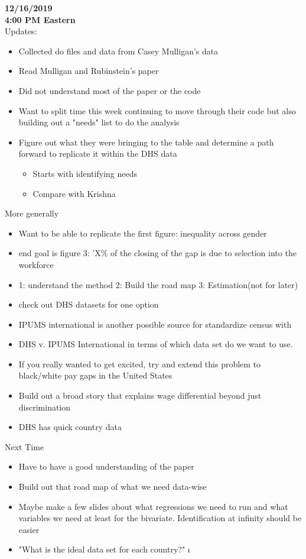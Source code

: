 
\let\counterwithout\relax
\let\counterwithin\relax
{}


\noindent \textbf{12/16/2019}\\
\noindent \textbf{4:00 PM Eastern}\\
\bigskip
Updates:\\
\begin{itemize}
\item Collected do files and data from Casey Mulligan's data
\item Read Mulligan and Rubinstein's paper
\item Did not understand most of the paper or the code
\item Want to split time this week continuing to move through their code but also building out a "needs" list to do the analysis
\item Figure out what they were bringing to the table and determine a path forward to replicate it within the DHS data
\begin{itemize}
\item Starts with identifying needs
\item Compare with Krishna
\end{itemize} 
\end{itemize}

More generally
\begin{itemize}
\item Want to be able to replicate the first figure: inequality across gender
\item end goal is figure 3: 'X\% of the closing of the gap is due to selection into the workforce
\item 1: understand the method 2: Build the road map 3: Estimation(not for later)
\item check out DHS datasets for one option
\item IPUMS international is another possible source for standardize census with 
\item DHS v. IPUMS International in terms of which data set do we want to use.
\item If you really wanted to get excited, try and extend this problem to black/white pay gaps in the United States
\item Build out a broad story that explains wage differential beyond just discrimination
\item DHS has quick country data
\end{itemize}

Next Time
\begin{itemize}
\item Have to have a good understanding of the paper
\item Build out that road map of what we need data-wise
\item Maybe make a few slides about what regressions we need to run and what variables we need at least for the bivariate. Identification at infinity should be easier
\item "What is the ideal data set for each country?"
\i
\end{itemize}
